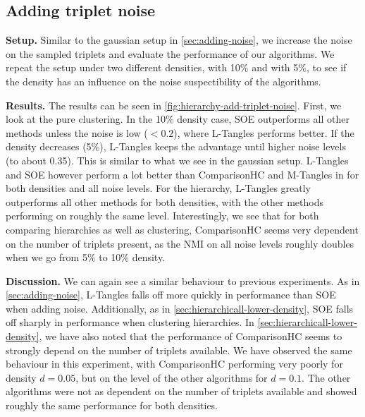 \subsection{Adding triplet noise}\label{sec:h-triplet-noise}
\textbf{Setup.}
Similar to the gaussian setup in \autoref{sec:adding-noise}, we increase the noise on the sampled triplets and evaluate the performance of our algorithms. 
We repeat the setup under two different densities, with 10\% and with 5\%, to see if the density has an influence
on the noise suspectibility of the algorithms.

\noindent
\textbf{Results.}
The results can be seen in \autoref{fig:hierarchy-add-triplet-noise}. 
First, we look at the pure clustering. In the 10\% density case, SOE outperforms all other methods unless the noise is
low ($<0.2$), where L-Tangles performs better. If the density decreases (5\%), L-Tangles keeps the 
advantage until higher noise levels (to about 0.35). 
This is similar to what we see in the gaussian setup.
L-Tangles and SOE however perform a lot better than ComparisonHC and M-Tangles in for both densities and all noise levels.  For the hierarchy, L-Tangles greatly outperforms all other methods for both densities,
with the other methods performing on roughly the same level. Interestingly, 
we see that for both comparing hierarchies as well as clustering, 
ComparisonHC seems very dependent on the number of triplets present, as the NMI on all noise levels
roughly doubles when we go from 5\% to 10\% density.

\textbf{Discussion.}
We can again see a similar behaviour to previous experiments. As in \autoref{sec:adding-noise}, L-Tangles falls off more quickly in performance than SOE when adding noise. 
Additionally, as in \autoref{sec:hierarchicall-lower-density}, SOE falls off sharply in performance when clustering hierarchies. In \autoref{sec:hierarchicall-lower-density}, 
we have also noted that the performance of ComparisonHC seems to strongly depend on the number of triplets available. We have observed the same behaviour in this experiment,
with ComparisonHC performing very poorly for density $d=0.05$, but on the level of the other algorithms for $d=0.1$. The other algorithms were not as dependent on the number of 
triplets available and showed roughly the same performance for both densities.

